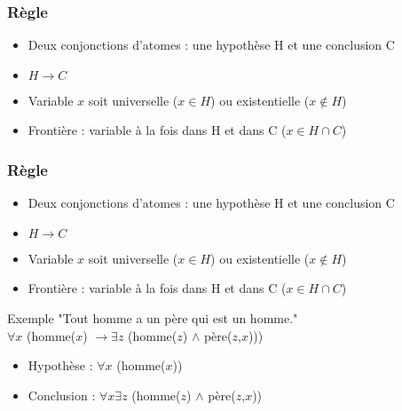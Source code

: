
\begin{frame}[t]
	\frametitle{Règle}
	\vspace{10mm}
	\begin{itemize}
		\item Deux conjonctions d'atomes : une hypothèse H et une conclusion C
		\item $H \rightarrow C$
		\item Variable $x$ soit universelle ($x \in H$) ou existentielle ($x \notin H$)
		\item Frontière : variable à la fois dans H et dans C ($x \in H \cap C$)\\
	\end{itemize}
\end{frame}

\begin{frame}[t]
	\frametitle{Règle}
	\vspace{10mm}
	\begin{itemize}
		\item Deux conjonctions d'atomes : une hypothèse H et une conclusion C
		\item $H \rightarrow C$
		\item Variable $x$ soit universelle ($x \in H$) ou existentielle ($x \notin H$)
		\item Frontière : variable à la fois dans H et dans C ($x \in H \cap C$)
	\end{itemize}
	\vfill
	\begin{exampleblock}{Exemple}
		"Tout homme a un père qui est un homme."\\
		$\forall x$ (homme($x$) $\rightarrow \exists z$ (homme($z$) $\wedge$ père($z$,$x$)))
		\begin{itemize}
			\item Hypothèse : $\forall x$ (homme($x$))
			\item Conclusion : $\forall x \exists z$ (homme($z$) $\wedge$ père($z$,$x$))
		\end{itemize}
	\end{exampleblock}
	\vspace{10mm}
\end{frame}




